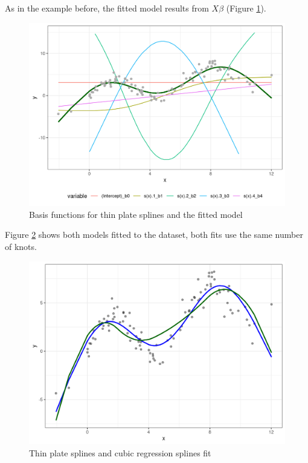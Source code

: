 \documentclass[
]{book}
\begin{document}
As in the example before, the fitted model results from \(X\beta\) (Figure \ref{fig:tpsbasisandmodel}).

\begin{figure}
\centering
\includegraphics{_bookdown_files/_main_files/figure-html/tpsbasisandmodel-1.png}
\caption{\label{fig:tpsbasisandmodel}Basis functions for thin plate splines and the fitted model}
\end{figure}

Figure \ref{fig:spliesandtps} shows both models fitted to the dataset, both fits use the same number of knots.

\begin{figure}
\centering
\includegraphics{_bookdown_files/_main_files/figure-html/spliesandtps-1.png}
\caption{\label{fig:spliesandtps}Thin plate splines and cubic regression splines fit}
\end{figure}
\end{document}
